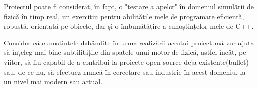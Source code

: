 \documentclass[12pt,a4paper]{report}
\newcommand{\worktype}[1]{[\textit{#1}] }
\newcommand{\dezvoltare}{\worktype{Dezvoltare de produs}}
\newcommand{\cercetare}{\worktype{Cercetare}}
\begin{document}
Proiectul poate fi considerat, în fapt, o "testare a apelor" în domeniul simulării de fizică în timp real, un exercițiu pentru abilitățile mele de programare eficientă, robustă, orientată pe obiecte, dar și o îmbunătățire a cunoștințelor mele de C++.

Consider că cunoștințele dobândite în urma realizării acestui proiect mă vor ajuta să înțeleg mai bine subtilitățile din spatele unui motor de fizică, astfel încât, pe viitor, să fiu capabil de a contribui la proiecte open-source deja existente(bullet\cite{bullet}) sau, de ce nu, să efectuez muncă în cercetare sau industrie în acest domeniu, la un nivel mai modern sau actual.


%
%
%
%
%
%
\end{document}
